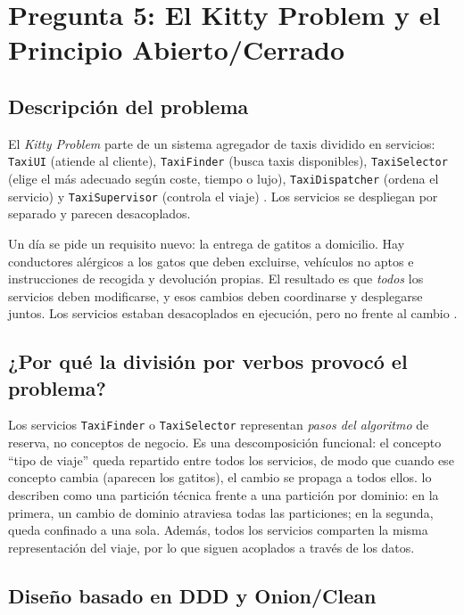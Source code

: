 \section{Pregunta 5: El Kitty Problem y el Principio Abierto/Cerrado}


\subsection{Descripción del problema}

El \textit{Kitty Problem} parte de un sistema agregador de taxis dividido en
servicios: \texttt{TaxiUI} (atiende al cliente), \texttt{TaxiFinder} (busca taxis
disponibles), \texttt{TaxiSelector} (elige el más adecuado según coste, tiempo o
lujo), \texttt{TaxiDispatcher} (ordena el servicio) y \texttt{TaxiSupervisor}
(controla el viaje) \parencite{martin2017}. Los servicios se despliegan por
separado y parecen desacoplados.

Un día se pide un requisito nuevo: la entrega de gatitos a domicilio. Hay
conductores alérgicos a los gatos que deben excluirse, vehículos no aptos e
instrucciones de recogida y devolución propias. El resultado es que \emph{todos}
los servicios deben modificarse, y esos cambios deben coordinarse y desplegarse
juntos. Los servicios estaban desacoplados en ejecución, pero no frente al
cambio \parencite{martin2017}.

\subsection{¿Por qué la división por verbos provocó el problema?}

Los servicios \texttt{TaxiFinder} o \texttt{TaxiSelector} representan
\emph{pasos del algoritmo} de reserva, no conceptos de negocio. Es una
descomposición funcional: el concepto \enquote{tipo de viaje} queda repartido
entre todos los servicios, de modo que cuando ese concepto cambia (aparecen los
gatitos), el cambio se propaga a todos ellos. \textcite{richardsford2020} lo
describen como una partición técnica frente a una partición por dominio: en la
primera, un cambio de dominio atraviesa todas las particiones; en la segunda,
queda confinado a una sola. Además, todos los servicios comparten la misma
representación del viaje, por lo que siguen acoplados a través de los datos.

\subsection{Diseño basado en DDD y Onion/Clean}

